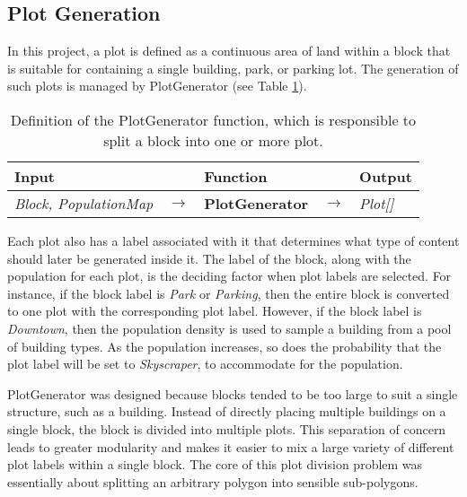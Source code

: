 \subsection{Plot Generation}  

In this project, a plot is defined as a continuous area of land within a block that is suitable for containing a single building, park, or parking lot.
The generation of such plots is managed by PlotGenerator (see Table \ref{table:plotgen}).

\begin{table}[H]
  \centering
  \begin{tabular}{lllll}
    \textbf{Input}                           &               & \textbf{Function}            &               & \textbf{Output}         \\
    \midrule
    \textit{Block, PopulationMap}            & $\rightarrow$ & \textbf{PlotGenerator}       & $\rightarrow$ & \textit{Plot[]}         \\
    \bottomrule
  \end{tabular}

  \caption{Definition of the PlotGenerator function, which is responsible to split a block into one or more plot.}
  \label{table:plotgen}
\end{table}
\vspace{-0.4cm} 

Each plot also has a label associated with it that determines what type of content should later be generated inside it. 
The label of the block, along with the population for each plot, is the deciding factor when plot labels are selected. 
For instance, if the block label is \textit{Park} or \textit{Parking}, then the entire block is converted to one plot with the corresponding plot label. 
However, if the block label is \textit{Downtown}, then the population density is used to sample a building from a pool of building types. 
As the population increases, so does the probability that the plot label will be set to \textit{Skyscraper}, to accommodate for the population. 

PlotGenerator was designed because blocks tended to be too large to suit a single structure, such as a building.
Instead of directly placing multiple buildings on a single block, the block is divided into multiple plots.
This separation of concern leads to greater modularity and makes it easier to mix a large variety of different plot labels within a single block.
The core of this plot division problem was essentially about splitting an arbitrary polygon into sensible sub-polygons. 

